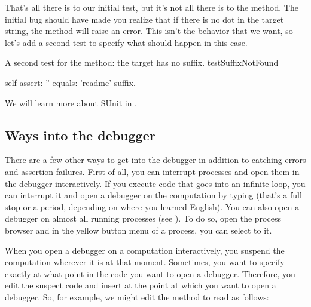 \documentclass[a4paper,10pt,twoside]{book}
\begin{document}
That's all there is to our initial test, but it's not all there is to the  method.
The initial bug should have made you realize that if there is no dot in the target string, the  method will raise an error.
This isn't the behavior that we want, so let's add a second test to specify what should happen in this case.

\begin{method}[testNoSuffix]{A second test for the  method: the target has no suffix.}
testSuffixNotFound

	self assert: '' equals: 'readme' suffix.
\end{method}



We will learn more about SUnit in .

\subsection{Ways into the debugger}

There are a few other ways to get into the debugger in addition to catching errors and assertion failures.
First of all, you can interrupt processes and open them in the debugger interactively.
If you execute code that goes into an infinite loop, you can interrupt it and open a debugger on the computation by typing  (that's a full stop or a period, depending on where you learned English).
You can also open a debugger on almost all running processes (see ). To do so, open the process browser and in the yellow button menu of a process, you can select to  it.

When you open a debugger on a computation interactively, you suspend the computation wherever it is at that moment.
Sometimes, you want to specify exactly at what point in the code you want to open a debugger.
Therefore, you edit the suspect code and insert  at the point at which you want to open a debugger.
So, for example, we might edit the  method to read as follows:
\end{document}
